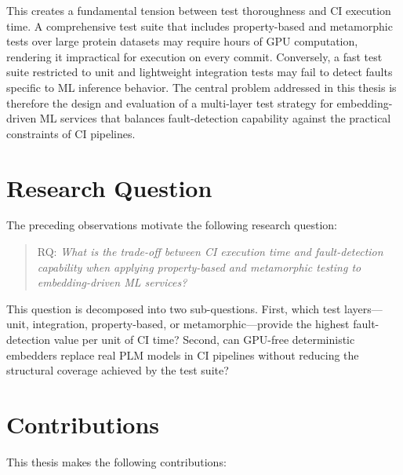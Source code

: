 This creates a fundamental tension between test thoroughness and \ac{CI} execution time. A comprehensive test suite that includes property-based and metamorphic tests over large protein datasets may require hours of \ac{GPU} computation, rendering it impractical for execution on every commit. Conversely, a fast test suite restricted to unit and lightweight integration tests may fail to detect faults specific to \ac{ML} inference behavior. The central problem addressed in this thesis is therefore the design and evaluation of a multi-layer test strategy for embedding-driven \ac{ML} services that balances fault-detection capability against the practical constraints of \ac{CI} pipelines.

\section{Research Question}\label{sec:research-question}

The preceding observations motivate the following research question:

\begin{quote}
  \ac{RQ}: \emph{What is the trade-off between \ac{CI} execution time and fault-detection capability when applying property-based and metamorphic testing to embedding-driven \ac{ML} services?}
\end{quote}

\noindent This question is decomposed into two sub-questions. First, which test layers---unit, integration, property-based, or metamorphic---provide the highest fault-detection value per unit of \ac{CI} time? Second, can \ac{GPU}-free deterministic embedders replace real \ac{PLM} models in \ac{CI} pipelines without reducing the structural coverage achieved by the test suite?

\section{Contributions}\label{sec:contributions}

This thesis makes the following contributions:

